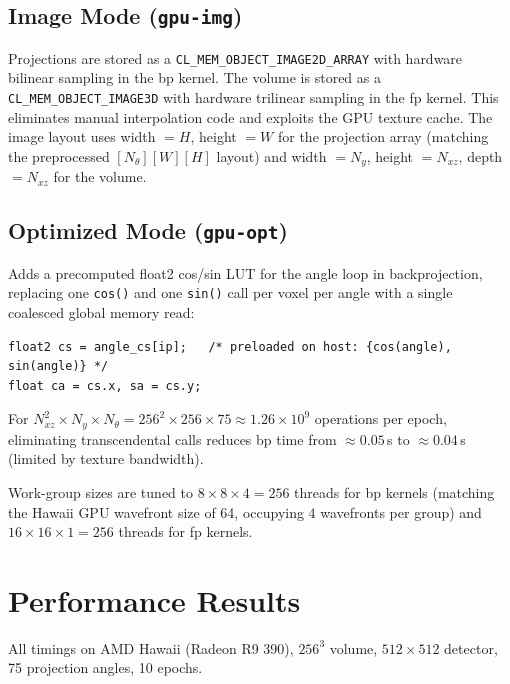 \documentclass[11pt,a4paper]{article}
\begin{document}
\subsection{Image Mode (\texttt{gpu-img})}

Projections are stored as a \texttt{CL\_MEM\_OBJECT\_IMAGE2D\_ARRAY} with
hardware bilinear sampling in the bp kernel. The volume is stored as a
\texttt{CL\_MEM\_OBJECT\_IMAGE3D} with hardware trilinear sampling in the fp
kernel. This eliminates manual interpolation code and exploits the GPU texture
cache. The image layout uses width $= H$, height $= W$ for the projection array
(matching the preprocessed $[N_\theta][W][H]$ layout) and
width $= N_y$, height $= N_{xz}$, depth $= N_{xz}$ for the volume.

\subsection{Optimized Mode (\texttt{gpu-opt})}

Adds a precomputed float2 cos/sin LUT for the angle loop in backprojection,
replacing one \texttt{cos()} and one \texttt{sin()} call per voxel per angle with
a single coalesced global memory read:

\begin{lstlisting}
float2 cs = angle_cs[ip];   /* preloaded on host: {cos(angle), sin(angle)} */
float ca = cs.x, sa = cs.y;
\end{lstlisting}

For $N_{xz}^2 \times N_y \times N_\theta = 256^2 \times 256 \times 75 \approx 1.26
\times 10^9$ operations per epoch, eliminating transcendental calls reduces bp time
from $\approx 0.05$\,s to $\approx 0.04$\,s (limited by texture bandwidth).

Work-group sizes are tuned to $8\times8\times4 = 256$ threads for bp kernels
(matching the Hawaii GPU wavefront size of 64, occupying 4 wavefronts per group)
and $16\times16\times1 = 256$ threads for fp kernels.

\section{Performance Results}
\label{sec:perf}

All timings on AMD Hawaii (Radeon R9 390), $256^3$ volume, $512\times512$ detector,
75 projection angles, 10 epochs.
\end{document}
